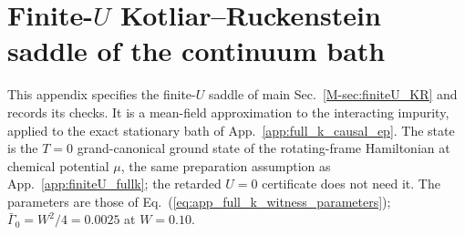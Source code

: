 \documentclass[%
  aps,physrev,onecolumn,10pt,amsmath,amssymb,superscriptaddress,longbibliography,floatfix
]{revtex4-2}
\begin{document}
\section{Finite-\texorpdfstring{$U$}{U} Kotliar--Ruckenstein saddle of the continuum bath}
\label{app:KR}

This appendix specifies the finite-$U$ saddle of main
Sec.~\ref{M-sec:finiteU_KR} and records its checks.  It is a mean-field
approximation to the interacting impurity, applied to the exact stationary
bath of App.~\ref{app:full_k_causal_ep}.  The state is the $T=0$
grand-canonical ground state of the rotating-frame Hamiltonian at chemical
potential $\mu$, the same preparation assumption as App.~\ref{app:finiteU_fullk};
the retarded $U=0$ certificate does not need it.  The parameters are those of
Eq.~(\ref{eq:app_full_k_witness_parameters}); $\bar\Gamma_0=W^2/4=0.0025$ at
$W=0.10$.
\end{document}

